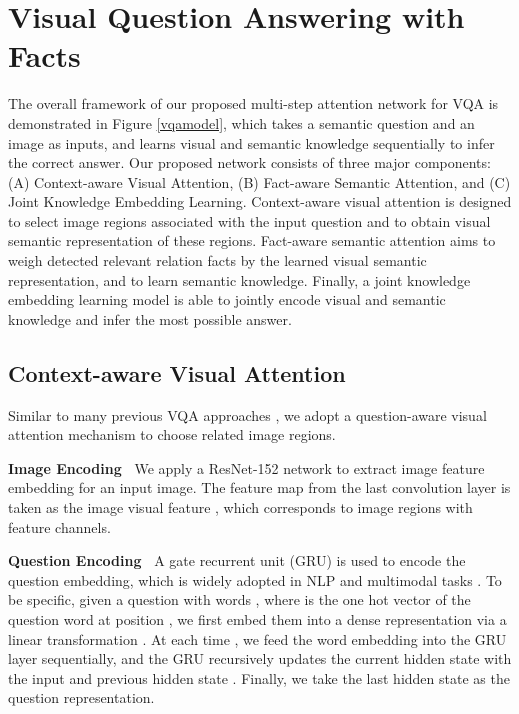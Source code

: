 \documentclass[sigconf]{acmart}
\begin{document}
\section{Visual Question Answering with Facts}\label{section:vqa}


The overall framework of our proposed multi-step attention network for VQA is demonstrated in Figure \ref{vqamodel}, which takes a semantic question and an image as inputs, and learns visual and semantic knowledge sequentially to infer the correct answer. Our proposed network consists of three major components: (A) Context-aware Visual Attention, (B) Fact-aware Semantic Attention, and (C) Joint Knowledge Embedding Learning. Context-aware visual attention is designed to select image regions associated with the input question and to obtain visual semantic representation of these regions. Fact-aware semantic attention aims to weigh detected relevant relation facts by the learned visual semantic representation, and to learn semantic knowledge.
Finally, a joint knowledge embedding learning model is able to jointly encode visual and semantic knowledge and infer the most possible answer.



\subsection{Context-aware Visual Attention}\label{subsection:51} 

Similar to many previous VQA approaches \cite{fukui2016multimodal,xu2016ask,yu2017multi}, we adopt
a question-aware visual attention mechanism to choose related image regions. 

\textbf{Image Encoding~} We apply a ResNet-152 network \cite{he2016deep} to extract image feature embedding for an input image. The  feature map from the last convolution layer is taken as the image visual feature , which corresponds to  image regions with  feature channels.

\textbf{Question Encoding~} A gate recurrent unit (GRU) \cite{cho2014learning} is used to encode the question embedding, which is widely adopted in NLP and multimodal tasks \cite{long2017cognition,li2017context,yu2017multi}. To be specific, given a question with  words , where  is the one hot vector of the question word at position , we first embed them into a dense representation via a linear transformation . At each time , we feed the word embedding  into the GRU layer sequentially, and the GRU recursively updates the current hidden state  with the input  and previous hidden state . Finally, we take the last hidden state  as the question representation.
\end{document}
